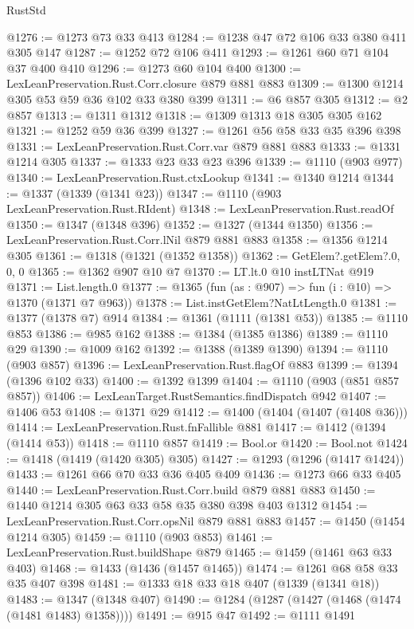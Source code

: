 \begin{lexlean}{RustStd}
\begin{coremodule}
{\begin{coremodule}
{{{{{{{{{{{{{{@1276 := @1273 @73 @33 @413
@1284 := @1238 @47 @72 @106 @33 @380 @411 @305 @147
@1287 := @1252 @72 @106 @411
@1293 := @1261 @60 @71 @104 @37 @400 @410
@1296 := @1273 @60 @104 @400
@1300 := LexLeanPreservation.Rust.Corr.closure @879 @881 @883
@1309 := @1300 @1214 @305 @53 @59 @36 @102 @33 @380 @399
@1311 := @6 @857 @305
@1312 := @2 @857
@1313 := @1311 @1312
@1318 := @1309 @1313 @18 @305 @305 @162
@1321 := @1252 @59 @36 @399
@1327 := @1261 @56 @58 @33 @35 @396 @398
@1331 := LexLeanPreservation.Rust.Corr.var @879 @881 @883
@1333 := @1331 @1214 @305
@1337 := @1333 @23 @33 @23 @396
@1339 := @1110 (@903 @977)
@1340 := LexLeanPreservation.Rust.ctxLookup
@1341 := @1340 @1214
@1344 := @1337 (@1339 (@1341 @23))
@1347 := @1110 (@903 LexLeanPreservation.Rust.RIdent)
@1348 := LexLeanPreservation.Rust.readOf
@1350 := @1347 (@1348 @396)
@1352 := @1327 (@1344 @1350)
@1356 := LexLeanPreservation.Rust.Corr.lNil @879 @881 @883
@1358 := @1356 @1214 @305
@1361 := @1318 (@1321 (@1352 @1358))
@1362 := GetElem?.getElem?.{0, 0, 0}
@1365 := @1362 @907 @10 @7
@1370 := LT.lt.{0} @10 instLTNat @919
@1371 := List.length.{0}
@1377 := @1365 (fun (as : @907) => fun (i : @10) => @1370 (@1371 @7 @963))
@1378 := List.instGetElem?NatLtLength.{0}
@1381 := @1377 (@1378 @7) @914
@1384 := @1361 (@1111 (@1381 @53))
@1385 := @1110 @853
@1386 := @985 @162
@1388 := @1384 (@1385 @1386)
@1389 := @1110 @29
@1390 := @1009 @162
@1392 := @1388 (@1389 @1390)
@1394 := @1110 (@903 @857)
@1396 := LexLeanPreservation.Rust.flagOf @883
@1399 := @1394 (@1396 @102 @33)
@1400 := @1392 @1399
@1404 := @1110 (@903 (@851 @857 @857))
@1406 := LexLeanTarget.RustSemantics.findDispatch @942
@1407 := @1406 @53
@1408 := @1371 @29
@1412 := @1400 (@1404 (@1407 (@1408 @36)))
@1414 := LexLeanPreservation.Rust.fnFallible @881
@1417 := @1412 (@1394 (@1414 @53))
@1418 := @1110 @857
@1419 := Bool.or
@1420 := Bool.not
@1424 := @1418 (@1419 (@1420 @305) @305)
@1427 := @1293 (@1296 (@1417 @1424))
@1433 := @1261 @66 @70 @33 @36 @405 @409
@1436 := @1273 @66 @33 @405
@1440 := LexLeanPreservation.Rust.Corr.build @879 @881 @883
@1450 := @1440 @1214 @305 @63 @33 @58 @35 @380 @398 @403 @1312
@1454 := LexLeanPreservation.Rust.Corr.opsNil @879 @881 @883
@1457 := @1450 (@1454 @1214 @305)
@1459 := @1110 (@903 @853)
@1461 := LexLeanPreservation.Rust.buildShape @879
@1465 := @1459 (@1461 @63 @33 @403)
@1468 := @1433 (@1436 (@1457 @1465))
@1474 := @1261 @68 @58 @33 @35 @407 @398
@1481 := @1333 @18 @33 @18 @407 (@1339 (@1341 @18))
@1483 := @1347 (@1348 @407)
@1490 := @1284 (@1287 (@1427 (@1468 (@1474 (@1481 @1483) @1358))))
@1491 := @915 @47
@1492 := @1111 @1491
}}}}}}}}}}}}}}
\end{coremodule}}
\end{coremodule}
\end{lexlean}

